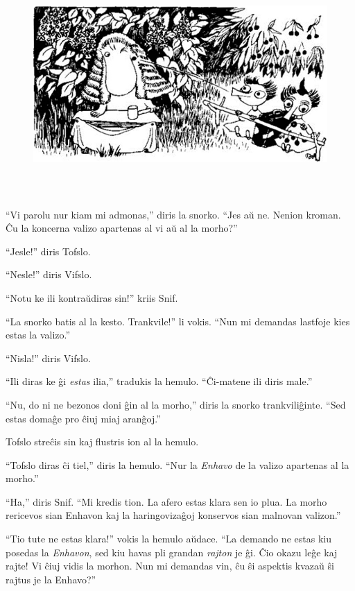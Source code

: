 \begin{figure}[htbp]
\centering
\includegraphics[width=450pt,height=240pt]{_31.jpg}
\caption{}
\label{_31}
\end{figure}

``Vi parolu nur kiam mi admonas,'' diris la snorko. ``Jes aŭ ne. Nenion kroman. Ĉu la koncerna valizo apartenas al vi aŭ al la morho?''

``Jesle!'' diris Tofslo.

``Nesle!'' diris Vifslo.

``Notu ke ili kontraŭdiras sin!'' kriis Snif.

``La snorko batis al la kesto. Trankvile!'' li vokis. ``Nun mi demandas lastfoje kies estas la valizo.''

``Nisla!'' diris Vifslo.

``Ili diras ke ĝi \emph{estas} ilia,'' tradukis la hemulo. ``Ĉi-matene ili diris male.''

``Nu, do ni ne bezonos doni ĝin al la morho,'' diris la snorko trankviliĝinte. ``Sed estas domaĝe pro ĉiuj miaj aranĝoj.''

Tofslo streĉis sin kaj flustris ion al la hemulo.

``Tofslo diras ĉi tiel,'' diris la hemulo. ``Nur la \emph{Enhavo} de la valizo apartenas al la morho.''

``Ha,'' diris Snif. ``Mi kredis tion. La afero estas klara sen io plua. La morho rericevos sian Enhavon kaj la haringovizaĝoj konservos sian malnovan valizon.''

``Tio tute ne estas klara!'' vokis la hemulo aŭdace. ``La demando ne estas kiu posedas la \emph{Enhavon}, sed kiu havas pli grandan \emph{rajton} je ĝi. Ĉio okazu leĝe kaj rajte! Vi ĉiuj vidis la morhon. Nun mi demandas vin, ĉu ŝi aspektis kvazaŭ ŝi rajtus je la Enhavo?''

